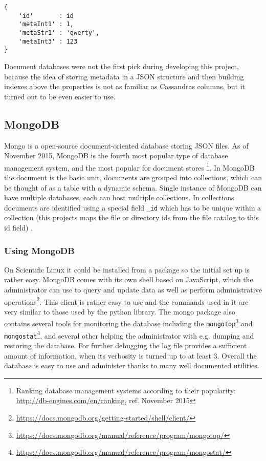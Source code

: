 \begin{verbatim}
{
	'id'       : id
	'metaInt1' : 1,
	'metaStr1' : 'qwerty',
	'metaInt3' : 123
}
\end{verbatim}


Document databases were not the first pick during developing this project, because the idea of
storing metadata in a JSON structure and then building indexes above the properties is not as
familiar as Cassandras columns, but it turned out to be even easier to use.

\subsection{MongoDB}

Mongo is a open-source document-oriented database storing JSON files. As of November 2015, MongoDB is the fourth 
most popular type of database management system, and the most popular for document stores 
\footnote{Ranking database management systems according to their popularity: \url{http://db-engines.com/en/ranking}, ref. November 2015}. 
In MongoDB the document is the basic unit, documents are grouped into collections, which can be thought of as 
a table with a dynamic schema. Single instance of MongoDB can have multiple databases, each can host multiple 
collections. In collections documents are identified using a special field \texttt{\_id} which has to be unique
within a collection\cite{MongoBook} (this projects maps the file or directory ids from the file catalog 
to this id field) .

\subsubsection{Using MongoDB}

On Scientific Linux it could be installed from a package so the initial set up is rather easy.
MongoDB comes with its own shell based on
JavaScript, which the administrator can use to query and update data as well as perform administrative 
operations\footnote{\url{https://docs.mongodb.org/getting-started/shell/client/}}. This client is rather easy to
use and the commands used in it are very similar to those used by the python library. The mongo
package also contains several tools for monitoring the database
including the \texttt{mongotop}\footnote{\url{https://docs.mongodb.org/manual/reference/program/mongotop/}} 
and \texttt{mongostat}\footnote{\url{https://docs.mongodb.org/manual/reference/program/mongostat/}}, and several 
other helping the administrator with e.g. dumping and restoring the database. For further 
debugging the log file provides a sufficient amount of information, when its verbosity is turned up to at least 3.
Overall the database is easy to use and administer thanks to many well documented utilities. 

